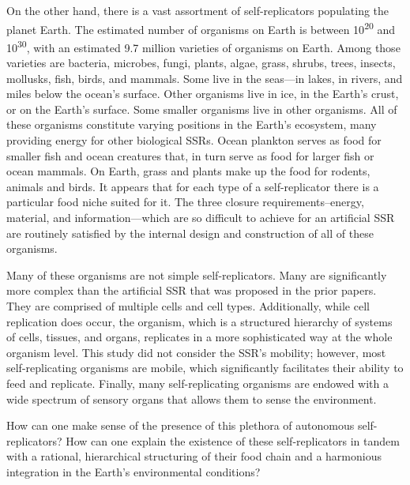 On the other hand, there is a vast assortment of
self-replicators populating the planet Earth. The estimated number of
organisms on Earth is between 10\textsuperscript{20} and
10\textsuperscript{30}, with an estimated 9.7 million varieties of
organisms on Earth. Among those varieties are bacteria, microbes,
fungi, plants, algae, grass, shrubs, trees, insects, mollusks, fish,
birds, and mammals. Some live in the seas---in 
lakes,  in rivers, and miles below the ocean's surface. Other
organisms live in ice, in the Earth’s crust, or on the Earth’s surface.
Some smaller organisms live in other organisms. 
All of these organisms constitute varying positions in the Earth's ecosystem, 
many providing energy for other biological SSRs.
Ocean
plankton serves as food for smaller fish and ocean creatures that, in
turn serve as food for larger fish or ocean mammals. On Earth, grass
and plants make up the food for rodents, animals and birds. It appears
that for each type of a self-replicator there is a particular food
niche suited for it. 
The three closure requirements--energy, material, and information---which 
are so difficult to achieve for an artificial SSR are routinely satisfied 
by the internal design and construction of all of these organisms.

Many of these organisms are not simple self-replicators. Many are significantly more complex than the artificial SSR  that was proposed in the prior papers. They are comprised of multiple cells and cell types. Additionally, while cell replication does occur, the organism, which is a structured hierarchy of systems of cells, tissues, and organs, replicates in a more sophisticated way at the whole organism level. This study did not consider the SSR’s mobility; however, most self-replicating organisms are mobile, which significantly facilitates their ability to feed and replicate. Finally, many self-replicating organisms are endowed with a wide spectrum of sensory organs that allows them to sense the environment.

How can one make sense of the presence of this plethora of
autonomous self-replicators? How can one explain the
existence of these self-replicators in tandem with a rational, hierarchical
structuring of their food chain and a harmonious integration in the
Earth’s environmental conditions?

